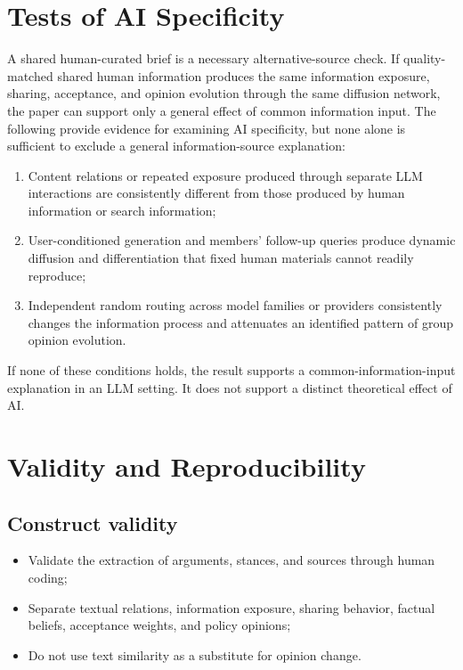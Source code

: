 \documentclass[11pt,a4paper]{article}
\begin{document}
\section{Tests of AI Specificity}

A shared human-curated brief is a necessary alternative-source check. If quality-matched shared human information produces the same information exposure, sharing, acceptance, and opinion evolution through the same diffusion network, the paper can support only a general effect of common information input. The following provide evidence for examining AI specificity, but none alone is sufficient to exclude a general information-source explanation:

\begin{enumerate}
\item Content relations or repeated exposure produced through separate LLM interactions are consistently different from those produced by human information or search information;
\item User-conditioned generation and members' follow-up queries produce dynamic diffusion and differentiation that fixed human materials cannot readily reproduce;
\item Independent random routing across model families or providers consistently changes the information process and attenuates an identified pattern of group opinion evolution.
\end{enumerate}

If none of these conditions holds, the result supports a common-information-input explanation in an LLM setting. It does not support a distinct theoretical effect of AI.

\section{Validity and Reproducibility}

\subsection{Construct validity}

\begin{itemize}
\item Validate the extraction of arguments, stances, and sources through human coding;
\item Separate textual relations, information exposure, sharing behavior, factual beliefs, acceptance weights, and policy opinions;
\item Do not use text similarity as a substitute for opinion change.
\end{itemize}
\end{document}
